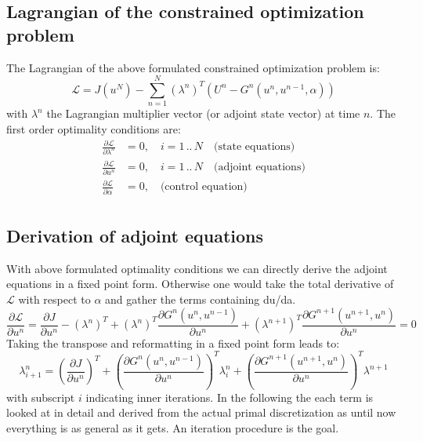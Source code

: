 \documentclass[10pt]{article}
\begin{document}
\subsection{Lagrangian of the constrained optimization problem}
The Lagrangian of the above formulated constrained optimization problem is:
\begin{equation}
\mathcal{L} = J\left( u^N \right) - \sum_{n=1}^{N} \left( \lambda^n \right)^T\left( U^n - G^n \left( u^n, u^{n-1}, \alpha \right) \right)
\end{equation}
with $\lambda^n$ the Lagrangian multiplier vector (or adjoint state vector) at time $n$. The first order optimality conditions are:
\begin{align}
\frac{\partial \mathcal{L}}{\partial \lambda^n} &= 0,\quad i= 1\,..\,N\quad\text{(state equations)}\\
\frac{\partial \mathcal{L}}{\partial u^n} &= 0,\quad i= 1\,..\,N\quad\text{(adjoint equations)}\\
\frac{\partial \mathcal{L}}{\partial \alpha} &= 0,\quad\text{(control equation)}\\
\end{align}
\subsection{Derivation of adjoint equations}
With above formulated optimality conditions we can directly derive the adjoint equations in a fixed point form. Otherwise one would take the total derivative of $\mathcal{L}$ with respect to $\alpha$ and gather the terms containing du/da.
\begin{equation}
\frac{\partial \mathcal{L}}{\partial u^n} = \frac{\partial J}{\partial u^n} - \left( \lambda^n \right)^T +\left( \lambda^n \right)^T \frac{\partial G^n \left( u^n,u^{n-1} \right)}{\partial u^n} +\left( \lambda^{n+1} \right)^T \frac{\partial G^{n+1}\left( u^{n+1},u^{n} \right)}{\partial u^n}  = 0
\end{equation}
Taking the transpose and reformatting in a fixed point form leads to:
\begin{equation}
\lambda^{n}_{i+1} = \left( \frac{\partial J}{\partial u^n} \right)^T + \left( \frac{\partial G^n\left( u^n,u^{n-1} \right)}{\partial u^n}  \right)^T \lambda^n_i  +\left( \frac{\partial G^{n+1}\left( u^{n+1},u^{n} \right)}{\partial u^n}  \right)^T \lambda^{n+1}
\end{equation}
with subscript $i$ indicating inner iterations. In the following the each term is looked at in detail and derived from the actual primal discretization as until now everything is as general as it gets. An iteration procedure is the goal. 
\end{document}
